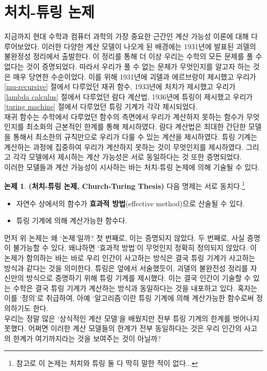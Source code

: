\documentclass[b5paper, 11pt]{book}
\theoremstyle{definition}
\newtheorem{thesis}[defn]{논제}
\begin{document}
\section{처치-튜링 논제}
지금까지 현대 수학과 컴퓨터 과학의 가장 중요한 근간인 계산 가능성 이론에 대해 다루어보았다. 이러한 다양한 계산 모델이 나오게 된 배경에는 1931년에 발표된 괴델의 불완정성 정리에서 출발한다. 이 정리를 통해 더 이상 우리는 수학의 모든 문제를 풀 수 없다는 것이 증명되었다. 따라서 우리가 풀 수 없는 문제가 무엇인지를 알고자 하는 것은 매우 당연한 수순이었다. 이를 위해 1931년에 괴델과 에르브랑이 제시했고 우리가 \ref{mu-recursive} 절에서 다루었던 재귀 함수, 1933년에 처치가 제시했고 우리가 \ref{lambda calculus} 절에서 다루었던 람다 계산법, 1936년에 튜링이 제시했고 우리가 \ref{turing machine} 절에서 다루었던 튜링 기계가 각각 제시되었다. \\
재귀 함수는 수학에서 다루었던 함수의 측면에서 우리가 계산하지 못하는 함수가 무엇인지를 최소화의 근본적인 한계를 통해 제시하였다. 람다 계산법은 최대한 간단한 모델을 통해서 최소한의 규칙만으로 우리가 다룰 수 있는 계산을 제시하였다. 튜링 기계는 계산하는 과정에 집중하여 우리가 계산하지 못하는 것이 무엇인지를 제시하였다. 그리고 각각 모델에서 제시하는 계산 가능성은 서로 동일하다는 것 또한 증명되었다. \\
이러한 모델들과 계산 가능성이 시사하는 바는 처치-튜링 논제에 의해 기술될 수 있다.
\begin{thesis} 
    \textbf{(처치-튜링 논제, Church-Turing Thesis)} 다음 명제는 서로 동치다.\footnote{참고로 이 논제는 처치와 튜링 둘 다 딱히 말한 적이 없다...}
    \begin{itemize}
        \item 자연수 상에서의 함수가 \textbf{효과적 방법}(effective method)으로 산술될 수 있다.
        \item 튜링 기계에 의해 계산가능한 함수다.
    \end{itemize}
\end{thesis}
먼저 위 논제는 왜 `논제'일까? 첫 번째로, 이는 증명되지 않았다. 두 번째로, 사실 증명이 불가능할 수 있다. 왜냐하면 `효과적 방법'이 무엇인지 정확히 정의되지 않았다. 이 논제가 함의하는 바는 바로 우리 인간이 사고하는 방식은 결국 튜링 기계가 사고하는 방식과 같다는 것을 의미한다. 튜링은 앞에서 서술했듯이, 괴델의 불완전성 정리를 자신만의 방식으로 증명하기 위해 튜링 기계를 제시했다. 이는 결국 인간이 기술할 수 있는 수학은 결국 튜링 기계가 계산하는 방식과 동일하다는 것을 내포하고 있다.   혹자는 이를 `정의'로 취급하여, 아예 `알고리즘'이란 튜링 기계에 의해 계산가능한 함수로써 정의하기도 한다.\\
우리는 정말 많은 `상식적인 계산 모델'을 배웠지만 전부 튜링 기계의 한계를 벗어나지 못했다. 어쩌면 이러한 계산 모델들의 한계가 전부 동일하다는 것은 우리 인간의 사고의 한계가 여기까지라는 것을 보여주는 것이 아닐까?
\end{document}
